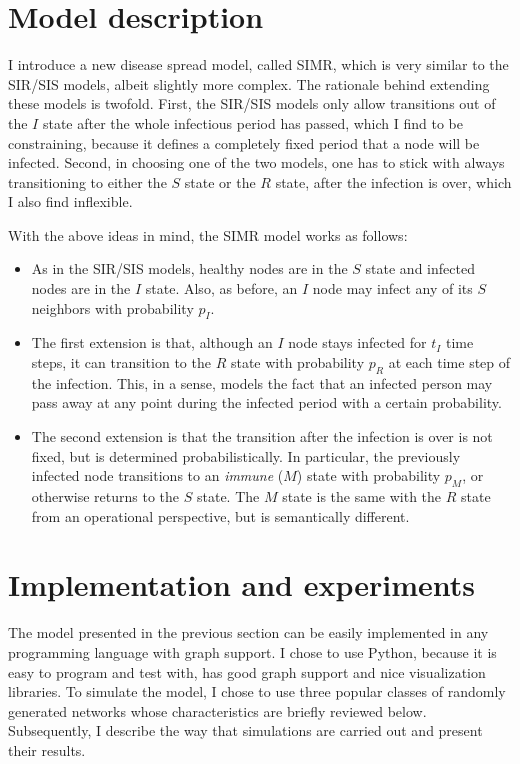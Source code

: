 \documentclass[11pt]{article} %
\begin{document}
\section{Model description}
I introduce a new disease spread model, called SIMR, which is very similar to
the SIR/SIS models, albeit slightly more complex. The rationale behind extending
these models is twofold. First, the SIR/SIS models only allow transitions out
of the $I$ state after the whole infectious period has passed, which I find to be
constraining, because it defines a completely fixed period that a node will be
infected. Second, in choosing one of the two models, one has to stick with
always transitioning to either the $S$ state or the $R$ state, after the infection
is over, which I also find inflexible.

With the above ideas in mind, the SIMR model works as follows:
\begin{itemize}
\item As in the SIR/SIS models, healthy nodes are in the $S$ state and infected
nodes are in the $I$ state. Also, as before, an $I$ node may infect any of its
$S$ neighbors with probability $p_I$.
\item The first extension is that, although an $I$ node stays infected for $t_I$
time steps, it can transition to the $R$ state with probability $p_R$ at each
time step of the infection. This, in a sense, models the fact that an infected
person may pass away at any point during the infected period with a certain
probability.
\item The second extension is that the transition after the infection is over
is not fixed, but is determined probabilistically. In particular, the previously
infected node transitions to an \emph{immune} ($M$) state with probability $p_M$,
or otherwise returns to the $S$ state. The $M$ state is the same with the $R$
state from an operational perspective, but is semantically different.
\end{itemize}

\section{Implementation and experiments}
The model presented in the previous section can be easily implemented in any
programming language with graph support. I chose to use Python, because it is
easy to program and test with, has good graph support and nice visualization
libraries.
To simulate the model, I chose to use three popular classes of randomly generated
networks whose characteristics are briefly reviewed below. Subsequently, I
describe the way that simulations are carried out and present their results.
\end{document}
